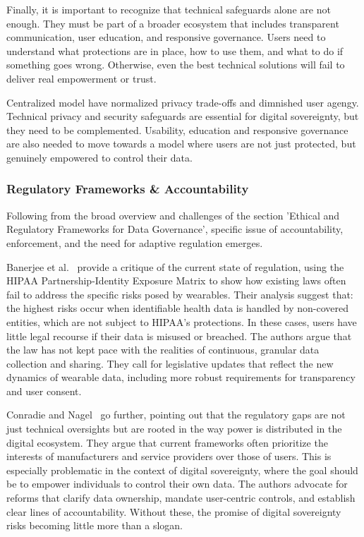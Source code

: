 	Finally, it is important to recognize that technical safeguards alone are not enough. They must be part of a broader ecosystem that includes transparent communication, user education, and responsive governance. Users need to understand what protections are in place, how to use them, and what to do if something goes wrong. Otherwise, even the best technical solutions will fail to deliver real empowerment or trust.

	Centralized model have normalized privacy trade-offs and dimnished user agengy. Technical privacy and security safeguards are essential for digital sovereignty, but they need to be complemented. Usability, education and responsive governance are also needed to move towards a model where users are not just protected, but genuinely empowered to control their data.
	\subsubsection{Regulatory Frameworks \& Accountability}

	Following from the broad overview and challenges of the section 'Ethical and Regulatory Frameworks for Data Governance', specific issue of accountability, enforcement, and the need for adaptive regulation emerges.

	Banerjee et al.~\cite{Banerjee2018} provide a critique of the current state of regulation, using the HIPAA Partnership-Identity Exposure Matrix to show how existing laws often fail to address the specific risks posed by wearables. Their analysis suggest that: the highest risks occur when identifiable health data is handled by non-covered entities, which are not subject to HIPAA’s protections. In these cases, users have little legal recourse if their data is misused or breached. The authors argue that the law has not kept pace with the realities of continuous, granular data collection and sharing. They call for legislative updates that reflect the new dynamics of wearable data, including more robust requirements for transparency and user consent.

	Conradie and Nagel~\cite{Conradie2022} go further, pointing out that the regulatory gaps are not just technical oversights but are rooted in the way power is distributed in the digital ecosystem. They argue that current frameworks often prioritize the interests of manufacturers and service providers over those of users. This is especially problematic in the context of digital sovereignty, where the goal should be to empower individuals to control their own data. The authors advocate for reforms that clarify data ownership, mandate user-centric controls, and establish clear lines of accountability. Without these, the promise of digital sovereignty risks becoming little more than a slogan.

